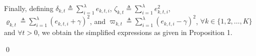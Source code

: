 \documentclass[onecolumn]{IEEEtran}
\begin{document}
Finally, defining $\delta_{k,t} \triangleq \sum_{i=1}^{\lambda} e_{k,t,i}$, $\zeta_{k,t} \triangleq \sum_{i=1}^{\lambda} e_{k,t,i}^2$, $\varrho_{k,t} \triangleq \sum_{i=1}^{\lambda} (e_{k,t,i} + \gamma)^2$, and $\varpi_{k,t} \triangleq \sum_{i=1}^{\lambda} (e_{k,t,i} - \gamma)^2$, $\forall k \in \{1,2,\dots,K\}$ and $\forall t > 0$, we obtain the simplified expressions as given in Proposition 1.

\qed





\end{document}
